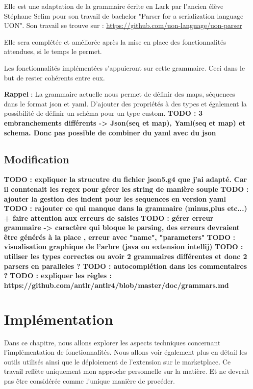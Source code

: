 \documentclass[
    iict, %
    il, %
]{heig-tb}
\begin{document}
Elle est une adaptation de la grammaire écrite en Lark par l'ancien élève Stéphane Selim pour son travail de bachelor "Parser for a serialization language UON". Son travail se trouve sur :
\href{https://github.com/uon-language/uon-parser}{https://github.com/uon-language/uon-parser}

Elle sera complétée et améliorée après la mise en place des fonctionnalités attendues, si le temps le permet.

Les fonctionnalités implémentées s'appuieront sur cette grammaire. Ceci dans le but de rester cohérents entre eux.

\textbf{Rappel} :
La grammaire actuelle nous permet de définir des maps, séquences dans le format json et yaml. D'ajouter des propriétés à des types et également la possibilité de définir un schéma pour un type custom.
\textbf{TODO : 3 embranchements différents -> Json(seq et map), Yaml(seq et map) et schema. Donc pas possible de combiner du yaml avec du json}

\section{Modification}
\textbf{TODO : expliquer la strucutre du fichier json5.g4 que j'ai adapté. Car il conntenait les regex pour gérer les string de manière souple}
\textbf{TODO : ajouter la gestion des indent pour les sequences en version yaml }
\textbf{TODO : rajouter ce qui manque dans la grammaire (minus,plus etc...) + faire attention aux erreurs de saisies}
\textbf{TODO : gérer erreur grammaire -> caractère qui bloque le parsing, des erreurs devraient être générés à la place , erreur avec "name", "parameters"}
\textbf{TODO : visualisation graphique de l'arbre (java ou extension intellij)}
\textbf{TODO : utiliser les types correctes ou avoir 2 grammaires différentes et donc 2 parsers en paralleles ?}
\textbf{TODO : autocomplétion dans les commentaires ?}
\textbf{TODO : expliquer les règles : https://github.com/antlr/antlr4/blob/master/doc/grammars.md}


\chapter{Implémentation}
Dans ce chapitre, nous allons explorer les aspects techniques concernant l'implémentation de fonctionnalités. Nous allons voir également plus en détail les outils utilisés ainsi que le déploiement de l'extension sur le marketplace.
Ce travail reflète uniquement mon approche personnelle sur la matière. Et ne devrait pas être considérée comme l'unique manière de procéder.
\end{document}
